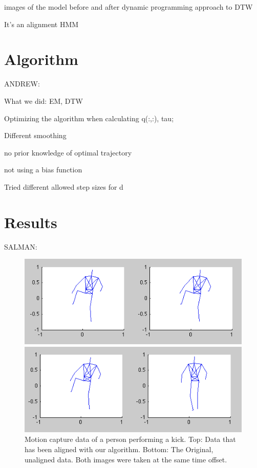 \documentclass{article}
\begin{document}
images of the model before and after dynamic programming approach to DTW

It's an alignment HMM

\section{Algorithm}

ANDREW:

What we did: EM, DTW

Optimizing the algorithm when calculating q(:,:), tau;

Different smoothing

no prior knowledge of optimal trajectory

not using a bias function

Tried different allowed step sizes for d

\section{Results}

SALMAN:




\begin{figure}
\begin{centering}
\includegraphics[width=\columnwidth]{figures/kick_aligned.png}

\vspace{0.1in}

\includegraphics[width=\columnwidth]{figures/kick_unaligned.png}

\caption{Motion capture data of a person performing a kick. Top: Data that has
been aligned with our algorithm. Bottom: The Original, unaligned data. Both
images were taken at the same time offset. \label{figure:kick}}

\end{centering}
\end{figure}
\end{document}
